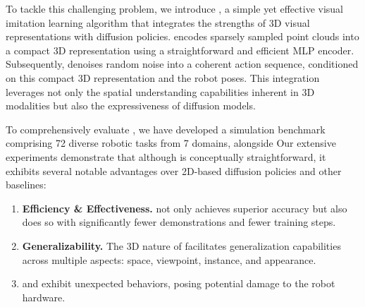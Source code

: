 

To tackle this challenging problem,  we introduce \textbf{\oursfull}, a  simple yet effective visual imitation learning algorithm that integrates the strengths of 3D visual representations with diffusion policies. \ours encodes sparsely sampled point clouds into a compact 3D representation using a straightforward and efficient MLP encoder. Subsequently, \ours denoises random noise into a coherent action sequence, conditioned on this compact 3D representation and the robot poses. This integration leverages not only the spatial understanding capabilities inherent in 3D modalities but also the expressiveness of diffusion models.


To comprehensively evaluate \ours, we have developed a simulation benchmark comprising 72 diverse robotic tasks from 7 domains, alongside  Our extensive experiments demonstrate that although \ours is conceptually straightforward, it exhibits several notable advantages over 2D-based diffusion policies and other baselines:

\begin{enumerate}
\item \textbf{Efficiency \& Effectiveness.} \ours not only achieves superior accuracy but also does so with significantly fewer demonstrations and fewer training steps.
\item \textbf{Generalizability.} The 3D nature of \ours facilitates generalization capabilities across multiple aspects: space, viewpoint, instance, and appearance. 
\item {} and exhibit unexpected behaviors, posing potential damage to the robot hardware.
\end{enumerate}


